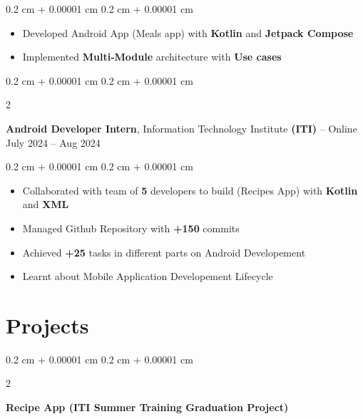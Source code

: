 \documentclass[10pt, letterpaper]{article}
\newenvironment{highlights}{
    \begin{itemize}[
        topsep=0.10 cm,
        parsep=0.10 cm,
        partopsep=0pt,
        itemsep=0pt,
        leftmargin=0.4 cm + 10pt
    ]
}{
    \end{itemize}
} %
\newenvironment{onecolentry}{
    \begin{adjustwidth}{
        0.2 cm + 0.00001 cm
    }{
        0.2 cm + 0.00001 cm
    }
}{
    \end{adjustwidth}
} %
\newenvironment{twocolentry}[2][]{
    \onecolentry
    \def\secondColumn{#2}
    \setcolumnwidth{\fill, 4.5 cm}
    \begin{paracol}{2}
}{
    \switchcolumn \raggedleft \secondColumn
    \end{paracol}
    \endonecolentry
} %
\let\hrefWithoutArrow\href
\renewcommand{\href}[2]{\hrefWithoutArrow{#1}{\ifthenelse{\equal{#2}{}}{ }{#2 }\raisebox{.15ex}{\footnotesize \faExternalLink*}}}
\begin{document}
        \vspace{0.10 cm}
        \begin{onecolentry}
            \begin{highlights}
                \item Developed Android App (Meals app) with \textbf{Kotlin} and \textbf{Jetpack Compose}
                \item Implemented \textbf{Multi-Module} architecture with \textbf{Use cases}
            \end{highlights}
        \end{onecolentry}


        \vspace{0.2 cm}

        \begin{twocolentry}{
            July 2024 – Aug 2024
        }
            \textbf{Android Developer Intern}, Information Technology Institute \textbf{(ITI)} -- Online\end{twocolentry}

        \vspace{0.10 cm}
        \begin{onecolentry}
            \begin{highlights}
                \item Collaborated with team of \textbf{5} developers to build (Recipes App) with \textbf{Kotlin} and \textbf{XML}
                \item Managed Github Repository with \textbf{+150} commits
                \item Achieved \textbf{+25} tasks in different parts on Android Developement
                \item Learnt about Mobile Application Developement Lifecycle
            \end{highlights}
        \end{onecolentry}



    
    \section{Projects}



        
        \begin{twocolentry}{
            \href{https://github.com/ahmedtelbani/RecipeApp}{Github}
        }
            \textbf{Recipe App (ITI Summer Training Graduation Project)}\end{twocolentry}
\end{document}
